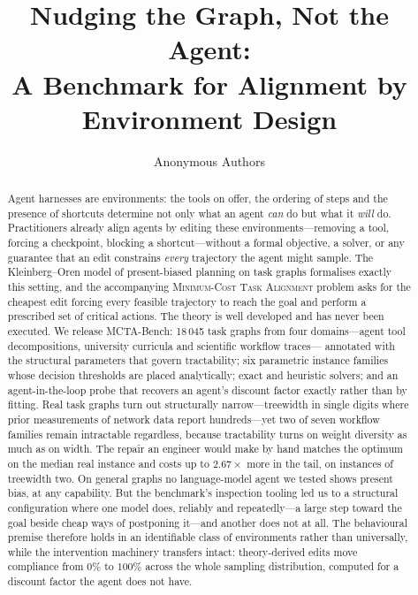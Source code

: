 \documentclass[10pt]{article}
\title{Nudging the Graph, Not the Agent:\\
       A Benchmark for Alignment by Environment Design}
\author{Anonymous Authors}
\date{}
\newcommand{\MCTA}{\textsc{Minimum-Cost Task Alignment}}
\begin{document}
\maketitle

\begin{abstract}
Agent harnesses are environments: the tools on offer, the ordering of steps and
the presence of shortcuts determine not only what an agent \emph{can} do but what
it \emph{will} do. Practitioners already align agents by editing these
environments---removing a tool, forcing a checkpoint, blocking a shortcut---without
a formal objective, a solver, or any guarantee that an edit constrains
\emph{every} trajectory the agent might sample. The Kleinberg--Oren model of
present-biased planning on task graphs formalises exactly this setting, and the
accompanying \MCTA{} problem asks for the cheapest edit forcing every feasible
trajectory to reach the goal and perform a prescribed set of critical actions. The
theory is well developed and has never been executed. We release MCTA-Bench: 18\,045
task graphs from four domains---agent tool decompositions, university curricula and
scientific workflow traces---
annotated with the structural parameters that govern tractability; six parametric
instance families whose decision thresholds are placed analytically; exact and
heuristic solvers; and an agent-in-the-loop probe that recovers an agent's discount
factor exactly rather than by fitting. Real task graphs turn out structurally
narrow---treewidth in single digits where prior measurements of network data report
hundreds---yet two of seven workflow families remain intractable regardless,
because tractability turns on weight diversity as much as on width. The repair an
engineer would make by hand matches the optimum on the median real instance and
costs up to $2.67\times$ more in the tail, on instances of treewidth two. On
general graphs no language-model agent we tested shows present bias, at any
capability. But the benchmark's inspection tooling led us to a structural
configuration where one model does, reliably and repeatedly---a large step toward
the goal beside cheap ways of postponing it---and another does not at all. The
behavioural premise therefore holds in an identifiable class of environments rather
than universally, while the intervention machinery transfers intact: theory-derived
edits move compliance from $0\%$ to $100\%$ across the whole sampling distribution,
computed for a discount factor the agent does not have.
\end{abstract}
\end{document}
